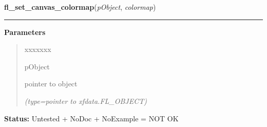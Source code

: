     \label{xformslib:library:fl_set_canvas_colormap}

    \vspace{0.5ex}

\hspace{.8\funcindent}\begin{boxedminipage}{\funcwidth}

    \raggedright \textbf{fl\_set\_canvas\_colormap}(\textit{pObject}, \textit{colormap})

    \vspace{-1.5ex}

    \rule{\textwidth}{0.5\fboxrule}
\setlength{\parskip}{2ex}
\setlength{\parskip}{1ex}
      \textbf{Parameters}
      \vspace{-1ex}

      \begin{quote}
        \begin{Ventry}{xxxxxxx}

          \item[pObject]

          pointer to object

            {\it (type=pointer to xfdata.FL\_OBJECT)}

        \end{Ventry}

      \end{quote}

\textbf{Status:} Untested + NoDoc + NoExample = NOT OK



    \end{boxedminipage}

    \label{xformslib:library:fl_set_canvas_visual}

    \vspace{0.5ex}

